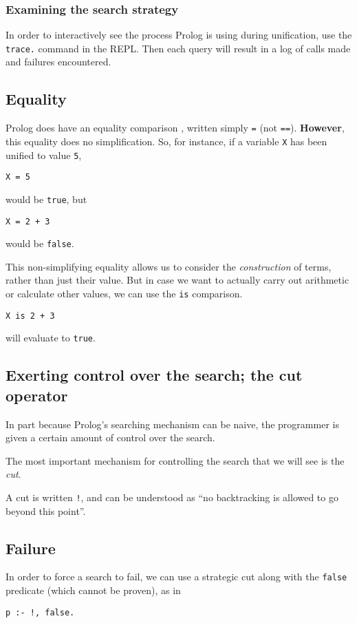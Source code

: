 \documentclass[11pt]{article}
\begin{document}
\subsubsection{Examining the search strategy}
\label{sec:org5fa59c9}
In order to interactively see the process Prolog is using
during unification,
use the \texttt{trace.} command in the REPL.
Then each query will result in a log of calls made and
failures encountered.

\subsection{Equality}
\label{sec:orga92b26f}
Prolog does have an equality comparison , written simply \texttt{=} (not \texttt{==}).
\textbf{However}, this equality does no simplification.
So, for instance, if a variable \texttt{X} has been unified to value \texttt{5},
\begin{verbatim}
X = 5
\end{verbatim}
would be \texttt{true}, but
\begin{verbatim}
X = 2 + 3
\end{verbatim}
would be \texttt{false}.

This non-simplifying equality allows us to consider
the \emph{construction} of terms, rather than just their value.
But in case we want to actually carry out arithmetic
or calculate other values,
we can use the \texttt{is} comparison.
\begin{verbatim}
X is 2 + 3
\end{verbatim}
will evaluate to \texttt{true}.

\subsection{Exerting control over the search; the cut operator}
\label{sec:orgd1555d3}
In part because Prolog's searching mechanism can be naive,
the programmer is given a certain amount of control
over the search.

The most important mechanism for controlling the search
that we will see is the \emph{cut}.

A cut is written \texttt{!}, and can be understood as
“no backtracking is allowed to go beyond this point”.

\subsection{Failure}
\label{sec:org125e4e3}
In order to force a search to fail, we can use a strategic cut
along with the \texttt{false} predicate (which cannot be proven),
as in
\begin{verbatim}
p :- !, false.
\end{verbatim}
\end{document}
